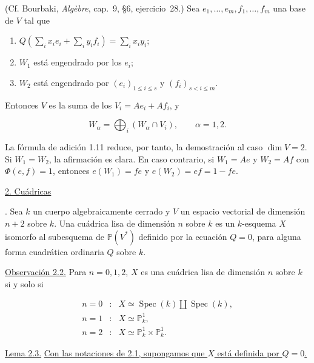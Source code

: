 (Cf. Bourbaki, \emph{Algèbre}, cap.~9, §6, ejercicio~28.) Sea
$e_1,\ldots,e_m,f_1,\ldots,f_m$ una base de $V$ tal que

\begin{enumerate}[label=\alph*),leftmargin=2.5em]
\item $Q(\sum_i x_i e_i+\sum_i y_i f_i)=\sum_i x_i y_i$;
\item $W_1$ está engendrado por los $e_i$;
\item $W_2$ está engendrado por $(e_i)_{1\leq i\leq s}$ y
$(f_i)_{s<i\leq m}$.
\end{enumerate}

Entonces $V$ es la suma de los $V_i=Ae_i+Af_i$, y

\begin{equation*}
W_\alpha=\bigoplus_i(W_\alpha\cap V_i),
\qquad \alpha=1,2.
\end{equation*}

La fórmula de adición 1.11 reduce, por tanto, la demostración al caso
$\dim V=2$. Si $W_1=W_2$, la afirmación es clara. En caso contrario, si
$W_1=Ae$ y $W_2=Af$ con $\Phi(e,f)=1$, entonces
$e(W_1)=fe$ y $e(W_2)=ef=1-fe$.

\bigskip
\noindent\underline{2. Cuádricas}

\medskip
{}. Sea $k$ un cuerpo algebraicamente cerrado y $V$ un espacio
vectorial de dimensión $n+2$ sobre $k$. Una cuádrica lisa de dimensión
$n$ sobre $k$ es un $k$-esquema $X$ isomorfo al subesquema de
$\mathbb P(V^*)$ definido por la ecuación $Q=0$, para alguna forma
cuadrática ordinaria $Q$ sobre $k$.

\medskip
\noindent\underline{Observación 2.2.}\quad
Para $n=0,1,2$, $X$ es una cuádrica lisa de dimensión $n$ sobre $k$ si y
solo si

\begin{equation*}
\begin{array}{rcl}
n=0 &:& X\simeq\operatorname{Spec}(k)\amalg\operatorname{Spec}(k),\\[1ex]
n=1 &:& X\simeq\mathbb P^1_k,\\[1ex]
n=2 &:& X\simeq\mathbb P^1_k\times\mathbb P^1_k.
\end{array}
\end{equation*}

\pageoriginale

\medskip
\noindent\underline{Lema 2.3.}\quad
\underline{Con las notaciones de 2.1, supongamos que $X$ está definida por
$Q=0$.}

